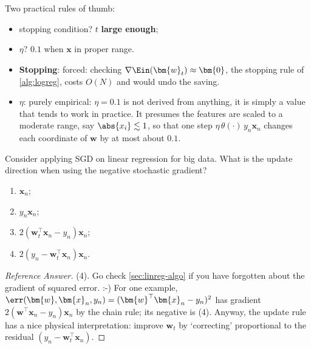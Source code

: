 Two practical rules of thumb:
\begin{itemize}
    \item stopping condition? \(t\) \textcolor{orange!85!black}{\textbf{large
        enough}};
    \item \(\eta\)? \textcolor{orange!85!black}{\(0.1\)} when \(\bm{x}\) in
        proper range.
\end{itemize}

\begin{itemize}
    \item \textbf{Stopping}: forced: checking \(\nabla \Ein(\bm{w}_t) \approx
        \bm{0}\), the stopping rule of \autoref{alg:logreg}, costs \(O(N)\) and
        would undo the saving.
    \item \textbf{\(\eta\)}: purely empirical: \(\eta = 0.1\) is not derived from
        anything, it is simply a value that tends to work in practice. It
        presumes the features are scaled to a moderate range, say \(\abs{x_i}
        \lesssim 1\), so that one step \(\eta \, \theta(\cdot) \, y_n
        \bm{x}_n\) changes each coordinate of \(\bm{w}\) by at most about
        \(0.1\).
\end{itemize}

\begin{exercise}
    Consider applying SGD on linear regression for big data. What is the update
    direction when using the negative stochastic gradient?
    \begin{enumerate}[(1)]
        \item \(\bm{x}_n\);
        \item \(y_n \bm{x}_n\);
        \item \(2(\bm{w}_t^\top \bm{x}_n - y_n) \bm{x}_n\);
        \item \(2(y_n - \bm{w}_t^\top \bm{x}_n) \bm{x}_n\).
    \end{enumerate}
\end{exercise}

\begin{proof}[Reference Answer]
    (4). Go check \autoref{sec:linreg-algo} if you have forgotten about the
    gradient of squared error. :-) For one example, \(\err(\bm{w}, \bm{x}_n,
    y_n) = (\bm{w}^\top \bm{x}_n - y_n)^2\) has gradient \(2(\bm{w}^\top
    \bm{x}_n - y_n) \bm{x}_n\) by the chain rule; its negative is (4).
    Anyway, the update rule has a nice physical interpretation: improve
    \(\bm{w}_t\) by `correcting' proportional to the residual \((y_n -
    \bm{w}_t^\top \bm{x}_n)\).
\end{proof}

